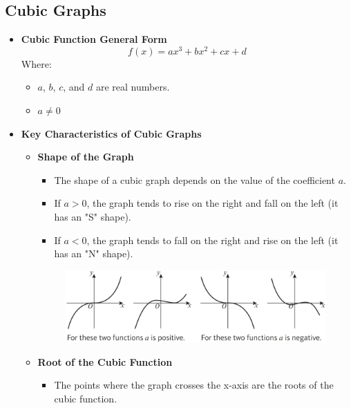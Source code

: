 
\subsection{Cubic Graphs}
\begin{itemize}
    \item \textbf{Cubic Function General Form}
    \begin{equation}
        f(x) = ax^3 + bx^2 + cx + d
    \end{equation}
    Where:
    \begin{itemize}
        \item $a$, $b$, $c$, and $d$ are real numbers.
        \item $a \neq 0$
    \end{itemize}
    \item \textbf{Key Characteristics of Cubic Graphs}
    \begin{itemize}
        \item \textbf{Shape of the Graph}
        \begin{itemize}
            \item The shape of a cubic graph depends on the value of the coefficient $a$.
            \item If $a > 0$, the graph tends to rise on the right and fall on the left (it has an "S" shape).
            \item If $a < 0$, the graph tends to fall on the right and rise on the left (it has an "N" shape).
        \end{itemize}
        \begin{figure}[H]
            \centering
            \includegraphics[scale=0.25]{Mathematics/Pure Mathematics/Ch4/Images/Ch4-1-1.png}
        \end{figure}
        \item \textbf{Root of the Cubic Function}
        \begin{itemize}
            \item The points where the graph crosses the x-axis are the roots of the cubic function.

\end{itemize}
\end{itemize}
\end{itemize}
